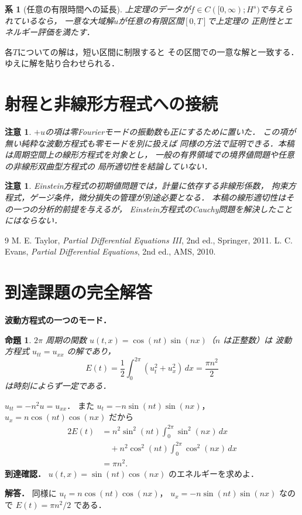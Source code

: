 \documentclass[a5paper,10pt,onecolumn]{jsarticle}
\makeatletter
\theoremstyle{mathnotetheorem}
\newtheorem{proposition}[theorem]{命題}
\newtheorem{corollary}[theorem]{系}
\newtheorem{remark}[theorem]{注意}
\renewcommand{\proofname}{証明}
\renewenvironment{proof}[1][\proofname]{%
  \par\pushQED{\qed}\normalfont\topsep4\p@\@plus2\p@\relax
  \trivlist\item[\hskip\labelsep\bfseries #1]\ignorespaces
}{\popQED\endtrivlist\@endpefalse}
\makeatother
\begin{document}
\begin{corollary}[任意の有限時間への延長]
上定理のデータが$f\in C([0,\infty);H^s)$で与えられているなら，
一意な大域解$u$が任意の有限区間$[0,T]$で上定理の
正則性とエネルギー評価を満たす．
\end{corollary}
\begin{proof}
各$T$についての解は，短い区間に制限すると
その区間での一意な解と一致する．ゆえに解を貼り合わせられる．
\end{proof}

\section{射程と非線形方程式への接続}
\begin{remark}
$+u$の項は零Fourierモードの振動数も正にするために置いた．
この項が無い純粋な波動方程式も零モードを別に扱えば
同様の方法で証明できる．本稿は周期空間上の線形方程式を対象とし，
一般の有界領域での境界値問題や任意の非線形双曲型方程式の
局所適切性を結論していない．
\end{remark}
\begin{remark}
Einstein方程式の初期値問題では，計量に依存する非線形係数，
拘束方程式，ゲージ条件，微分損失の管理が別途必要となる．
本稿の線形適切性はその一つの分析的前提を与えるが，
Einstein方程式のCauchy問題を解決したことにはならない．
\end{remark}

\begin{thebibliography}{9}
 M. E. Taylor, \emph{Partial Differential Equations III},
 2nd ed., Springer, 2011.
 L. C. Evans, \emph{Partial Differential Equations},
 2nd ed., AMS, 2010.
\end{thebibliography}

\section{到達課題の完全解答}
\noindent\textbf{波動方程式の一つのモード．}
\begin{proposition}
$2\pi$ 周期の関数
$u(t,x)=\cos(nt)\sin(nx)$（$n$ は正整数）は
波動方程式 $u_{tt}=u_{xx}$ の解であり，
\[
E(t)=\frac12\int_0^{2\pi}
(u_t^2+u_x^2)\,dx
=\frac{\pi n^2}{2}
\]
は時刻によらず一定である．
\end{proposition}
\begin{proof}
$u_{tt}=-n^2u=u_{xx}$．
また
$u_t=-n\sin(nt)\sin(nx)$，
$u_x=n\cos(nt)\cos(nx)$ だから
\[
\begin{aligned}
2E(t)
&=n^2\sin^2(nt)\int_0^{2\pi}\sin^2(nx)\,dx\\
&\quad+n^2\cos^2(nt)\int_0^{2\pi}\cos^2(nx)\,dx\\
&=\pi n^2.
\end{aligned}
\]
\end{proof}
\noindent\textbf{到達確認．}
$u(t,x)=\sin(nt)\cos(nx)$ のエネルギーを求めよ．
\par\noindent\textbf{解答．}
同様に $u_t=n\cos(nt)\cos(nx)$，
$u_x=-n\sin(nt)\sin(nx)$ なので
$E(t)=\pi n^2/2$ である．
\end{document}

